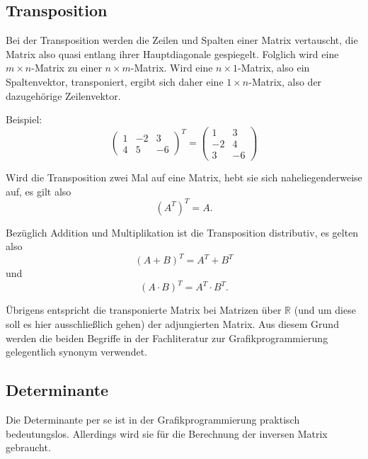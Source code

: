\subsection{Transposition}
\label{transposition}
Bei der Transposition werden die Zeilen und Spalten einer Matrix vertauscht, die Matrix also quasi entlang ihrer Hauptdiagonale gespiegelt. Folglich wird eine $m \times n$-Matrix zu einer $n \times m$-Matrix. Wird eine $n \times 1$-Matrix, also ein Spaltenvektor, transponiert, ergibt sich daher eine $1 \times n$-Matrix, also der dazugehörige Zeilenvektor.

Beispiel:
\begin{equation}
  \begin{pmatrix}
    1 & -2 & 3 \\
    4 & 5 & -6
  \end{pmatrix}^T
  =
  \begin{pmatrix}
    1 & 3 \\
    -2 & 4 \\
    3 & -6
  \end{pmatrix}
\end{equation}

Wird die Transposition zwei Mal auf eine Matrix, hebt sie sich naheliegenderweise auf, es gilt also
\begin{equation}
 (A^T)^T = A.
\end{equation}

Bezüglich Addition und Multiplikation ist die Transposition distributiv, es gelten also
\begin{equation}
 (A + B)^T = A^T + B^T
\end{equation}
und
\begin{equation}
 (A \cdot B)^T = A^T \cdot B^T.
\end{equation}

Übrigens entspricht die transponierte Matrix bei Matrizen über $\mathbb R$ (und um diese soll es hier ausschließlich gehen) der adjungierten Matrix. Aus diesem Grund werden die beiden Begriffe in der Fachliteratur zur Grafikprogrammierung gelegentlich synonym verwendet.

\subsection{Determinante}
Die Determinante per se ist in der Grafikprogrammierung praktisch bedeutungslos. Allerdings wird sie für die Berechnung der inversen Matrix gebraucht.


